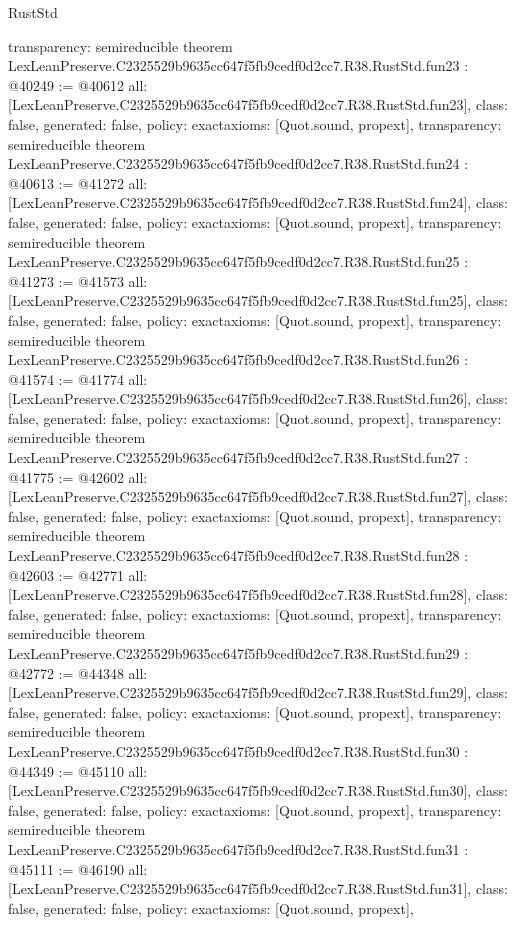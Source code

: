 \begin{lexlean}{RustStd}
\begin{coremodule}
{  transparency: semireducible
}
theorem LexLeanPreserve.C2325529b9635cc647f5fb9cedf0d2cc7.R38.RustStd.fun23 : @40249 := @40612 {
  all: [LexLeanPreserve.C2325529b9635cc647f5fb9cedf0d2cc7.R38.RustStd.fun23],
  class: false,
  generated: false,
  policy: exact{axioms: [Quot.sound, propext]},
  transparency: semireducible
}
theorem LexLeanPreserve.C2325529b9635cc647f5fb9cedf0d2cc7.R38.RustStd.fun24 : @40613 := @41272 {
  all: [LexLeanPreserve.C2325529b9635cc647f5fb9cedf0d2cc7.R38.RustStd.fun24],
  class: false,
  generated: false,
  policy: exact{axioms: [Quot.sound, propext]},
  transparency: semireducible
}
theorem LexLeanPreserve.C2325529b9635cc647f5fb9cedf0d2cc7.R38.RustStd.fun25 : @41273 := @41573 {
  all: [LexLeanPreserve.C2325529b9635cc647f5fb9cedf0d2cc7.R38.RustStd.fun25],
  class: false,
  generated: false,
  policy: exact{axioms: [Quot.sound, propext]},
  transparency: semireducible
}
theorem LexLeanPreserve.C2325529b9635cc647f5fb9cedf0d2cc7.R38.RustStd.fun26 : @41574 := @41774 {
  all: [LexLeanPreserve.C2325529b9635cc647f5fb9cedf0d2cc7.R38.RustStd.fun26],
  class: false,
  generated: false,
  policy: exact{axioms: [Quot.sound, propext]},
  transparency: semireducible
}
theorem LexLeanPreserve.C2325529b9635cc647f5fb9cedf0d2cc7.R38.RustStd.fun27 : @41775 := @42602 {
  all: [LexLeanPreserve.C2325529b9635cc647f5fb9cedf0d2cc7.R38.RustStd.fun27],
  class: false,
  generated: false,
  policy: exact{axioms: [Quot.sound, propext]},
  transparency: semireducible
}
theorem LexLeanPreserve.C2325529b9635cc647f5fb9cedf0d2cc7.R38.RustStd.fun28 : @42603 := @42771 {
  all: [LexLeanPreserve.C2325529b9635cc647f5fb9cedf0d2cc7.R38.RustStd.fun28],
  class: false,
  generated: false,
  policy: exact{axioms: [Quot.sound, propext]},
  transparency: semireducible
}
theorem LexLeanPreserve.C2325529b9635cc647f5fb9cedf0d2cc7.R38.RustStd.fun29 : @42772 := @44348 {
  all: [LexLeanPreserve.C2325529b9635cc647f5fb9cedf0d2cc7.R38.RustStd.fun29],
  class: false,
  generated: false,
  policy: exact{axioms: [Quot.sound, propext]},
  transparency: semireducible
}
theorem LexLeanPreserve.C2325529b9635cc647f5fb9cedf0d2cc7.R38.RustStd.fun30 : @44349 := @45110 {
  all: [LexLeanPreserve.C2325529b9635cc647f5fb9cedf0d2cc7.R38.RustStd.fun30],
  class: false,
  generated: false,
  policy: exact{axioms: [Quot.sound, propext]},
  transparency: semireducible
}
theorem LexLeanPreserve.C2325529b9635cc647f5fb9cedf0d2cc7.R38.RustStd.fun31 : @45111 := @46190 {
  all: [LexLeanPreserve.C2325529b9635cc647f5fb9cedf0d2cc7.R38.RustStd.fun31],
  class: false,
  generated: false,
  policy: exact{axioms: [Quot.sound, propext]},
}
\end{coremodule}
\end{lexlean}
